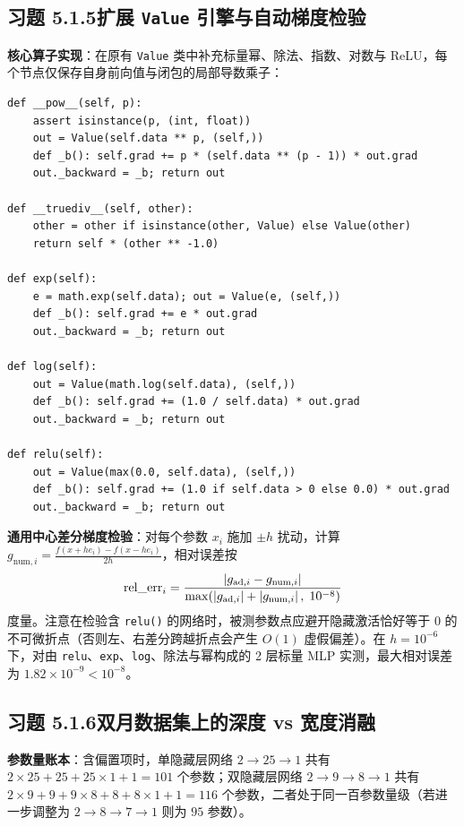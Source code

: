 \subsection*{习题 5.1.5\quad 扩展 \texttt{Value} 引擎与自动梯度检验}
\textbf{核心算子实现}：在原有 \texttt{Value} 类中补充标量幂、除法、指数、对数与 ReLU，每个节点仅保存自身前向值与闭包的局部导数乘子：
\begin{lstlisting}
def __pow__(self, p):
    assert isinstance(p, (int, float))
    out = Value(self.data ** p, (self,))
    def _b(): self.grad += p * (self.data ** (p - 1)) * out.grad
    out._backward = _b; return out

def __truediv__(self, other):
    other = other if isinstance(other, Value) else Value(other)
    return self * (other ** -1.0)

def exp(self):
    e = math.exp(self.data); out = Value(e, (self,))
    def _b(): self.grad += e * out.grad
    out._backward = _b; return out

def log(self):
    out = Value(math.log(self.data), (self,))
    def _b(): self.grad += (1.0 / self.data) * out.grad
    out._backward = _b; return out

def relu(self):
    out = Value(max(0.0, self.data), (self,))
    def _b(): self.grad += (1.0 if self.data > 0 else 0.0) * out.grad
    out._backward = _b; return out
\end{lstlisting}
\textbf{通用中心差分梯度检验}：对每个参数 $x_i$ 施加 $\pm h$ 扰动，计算 $g_{\text{num},i} = \frac{f(x + h e_i) - f(x - h e_i)}{2h}$，相对误差按
\[
  \mathrm{rel\_err}_i = \frac{\left|g_{\text{ad},i} - g_{\text{num},i}\right|}{\max(\left|g_{\text{ad},i}\right| + \left|g_{\text{num},i}\right|,\; 10^{-8})}
\]
度量。注意在检验含 \texttt{relu()} 的网络时，被测参数点应避开隐藏激活恰好等于 $0$ 的不可微折点（否则左、右差分跨越折点会产生 $O(1)$ 虚假偏差）。在 $h = 10^{-6}$ 下，对由 \texttt{relu}、\texttt{exp}、\texttt{log}、除法与幂构成的 2 层标量 MLP 实测，最大相对误差为 $1.82 \times 10^{-9} < 10^{-8}$。

\subsection*{习题 5.1.6\quad 双月数据集上的深度 vs 宽度消融}
\textbf{参数量账本}：含偏置项时，单隐藏层网络 $2 \to 25 \to 1$ 共有 $2\times 25 + 25 + 25\times 1 + 1 = 101$ 个参数；双隐藏层网络 $2 \to 9 \to 8 \to 1$ 共有 $2\times 9 + 9 + 9\times 8 + 8 + 8\times 1 + 1 = 116$ 个参数，二者处于同一百参数量级（若进一步调整为 $2 \to 8 \to 7 \to 1$ 则为 $95$ 参数）。

